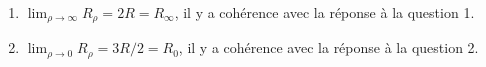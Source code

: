 \documentclass[a4paper, 10pt, garamond, oneside]{book}
\begin{document}
{\begin{enumerate}[resume]
		      Dans le cas où $D'$ est un générateur de courant de c.e.m. $i'=I_0$~:
		      \begin{itemize}
			      \item Si $D$ est un fil, $u=0$ et $i=I_0/2$~: $I_0=cI_0/2$,
			            donc $\boxed{c=2}$
			      \item Si $D$ est un interrupteur ouvert, $i=0$ et $u=RI_0$~:
			            $I_0=dRI_0$, donc $\boxed{d=1/R}$
		      \end{itemize}
		\item $\lim_{\rho\rightarrow \infty }R_\rho=2R=R_\infty$, il y a cohérence
		      avec la réponse à la question 1.
		\item $\lim_{\rho\rightarrow 0}R_\rho=3R/2=R_0$, il y a cohérence avec la
		      réponse à la question 2.
	\end{enumerate}
}

\newpage

\end{document}
